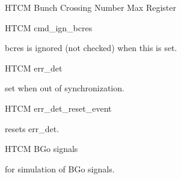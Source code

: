 \begin{register}{H}{TCM Bunch Crossing Number Max Register}{}%
    \label{tcm_bx_nr_max}
    \begin{regdesc}
    \end{regdesc}
\end{register}

\begin{register}{H}{TCM cmd\_ign\_bcres}{}%
    \label{cmd_ign_bcres}%
    \regnewline%
    \begin{regdesc}
    \begin{reglist}
        \item [cmd\_ign\_bcres] bcres is ignored (not checked) when this is set.
    \end{reglist}
    \end{regdesc}
\end{register}

\begin{register}{H}{TCM err\_det}{}%
    \label{err_det}%
    \regnewline%
    \begin{regdesc}
    \begin{reglist}
        \item [err\_det] set when out of synchronization.
    \end{reglist}
    \end{regdesc}
\end{register}

\begin{register}{H}{TCM err\_det\_reset\_event}{}%
    \label{err_det_reset_event}%
    \regnewline%
    \begin{regdesc}
    \begin{reglist}
        \item [err\_det\_reset\_event] resets err\_det.
    \end{reglist}
    \end{regdesc}
\end{register}

\begin{register}{H}{TCM BGo signals}{}%
    \label{bgos}%
    \regnewline%
    \begin{regdesc}
    \begin{reglist}
        \item [BGo signals] for simulation of BGo signals.
    \end{reglist}
    \end{regdesc}
\end{register}

